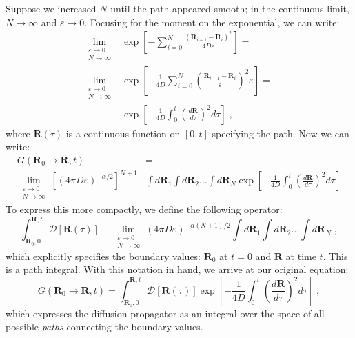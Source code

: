 \documentclass[letterpaper]{tufte-handout}
\renewcommand{\vec}[1]{\mathbf{#1}}
\begin{document}
Suppose we increased $N$ until the path appeared smooth; in the continuous limit, $N \to \infty$ and $\varepsilon \to 0$. Focusing for the moment on the exponential, we can write:
\begin{align}
\lim_{\substack{\varepsilon \to 0 \\ N \to \infty}} &\exp\left[ - \sum_{i=0}^{N} \frac{(\vec{R}_{i+1} - \vec{R}_i)^2}{4D\varepsilon}\right] =\\ 
\lim_{\substack{\varepsilon \to 0 \\ N \to \infty}}  &\exp\left[ - \frac{1}{4D}\sum_{i=0}^{N} {\left( \frac{\vec{R}_{i+1} - \vec{R}_i}{\varepsilon} \right)}^{2} \varepsilon \right] =\\
&\exp\left[ - \frac{1}{4D} \int_{0}^{t} \left(\frac{d\vec{R}}{d\tau}\right)^{2} d\tau\right] \; ,
\end{align}
where $\vec{R}(\tau)$ is a continuous function on $[0,t]$ specifying the path. Now we can write:
\begin{equation}
\begin{aligned}
G(\vec{R}_{0} \rightarrow \vec{R} , t) &=\\
\lim_{\substack{\varepsilon \to 0 \\ N \to \infty}} {\left[ (4\pi D \varepsilon)^{-\alpha/2} \right]}^{N+1} &\int d\vec{R}_1 \int d\vec{R}_2 \ldots \int d\vec{R}_N  \exp\left[ - \frac{1}{4D} \int_{0}^{t} \left(\frac{d\vec{R}}{d\tau}\right)^{2} d\tau\right]
\end{aligned}
\end{equation}
To express this more compactly, we define the following operator:
\begin{equation}
\int_{\vec{R}_{0},0}^{\vec{R},t} \mathscr{D}[\vec{R}(\tau)] \equiv \lim_{\substack{\varepsilon \to 0 \\ N \to \infty}} (4\pi D \varepsilon)^{-\alpha(N+1)/2} \int d\vec{R}_1 \int d\vec{R}_2 \ldots \int d\vec{R}_N \; ,
\end{equation}
which explicitly specifies the boundary values: $\vec{R}_{0}$ at $t=0$ and $\vec{R}$ at time $t$. This is a path integral. With this notation in hand, we arrive at our original equation:
\begin{equation} \label{eqn:gFinal}
G(\vec{R}_{0} \rightarrow \vec{R} , t) = \int_{\vec{R}_{0},0}^{\vec{R},t} \mathscr{D} [\vec{R}(\tau)]\exp\left[ -\frac{1}{4D} \int_{0}^{t} {\left(\frac{d\vec{R}}{d\tau} \right)}^{2} d\tau\right] \;,
\end{equation}
which expresses the diffusion propagator as an integral over the space of all possible \emph{paths} connecting the boundary values.
\end{document}
